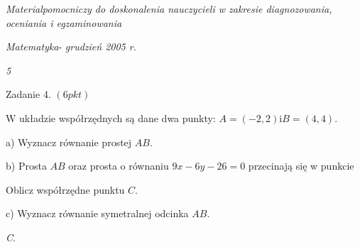 \documentclass[a4paper,12pt]{article}
\begin{document}
{\it Materialpomocniczy do doskonalenia nauczycieli w zakresie diagnozowania, oceniania i egzaminowania}

{\it Matematyka}- {\it grudzień 2005 r}.

{\it 5}

Zadanie 4. $(6pkt)$

$\mathrm{W}$ układzie współrzędnych są dane dwa punkty: $A=(-2,2)\mathrm{i}B=(4,4).$

a) Wyznacz równanie prostej $AB.$

b) Prosta $AB$ oraz prosta o równaniu $9x-6y-26=0$ przecinają się w punkcie

Oblicz współrzędne punktu $C.$

c) Wyznacz równanie symetralnej odcinka $AB.$

{\it C}.
\end{document}
